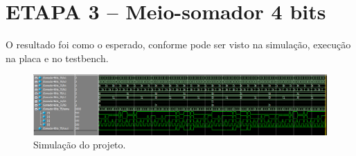	\section{ETAPA 3 – Meio-somador 4 bits}

	O resultado foi como o esperado, conforme pode ser visto na simulação, execução na placa e no testbench.
	\begin{figure}[H]
		\centering
		\caption{\label{fig:waveSomadorCompleto}Simulação do projeto.}
		\includegraphics[width=1\textwidth]{img/etapa3/waveSomadorCompleto4Bits}
	\end{figure}

